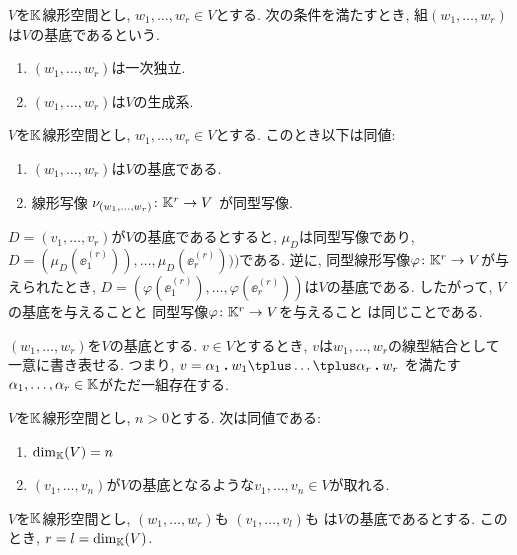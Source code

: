 \begin{definition}
  $V$を$\mathbb{K}$線形空間とし,
  $w_1,\ldots,w_r\in V$とする.
  次の条件を満たすとき,
  組$(w_1,\ldots,w_r)$は$V$の基底であるという.
  \begin{enumerate}
  \item $(w_1,\ldots,w_r)$は一次独立.
  \item $(w_1,\ldots,w_r)$は$V$の生成系.
  \end{enumerate}
\end{definition}
\begin{prop}
  $V$を$\mathbb{K}$線形空間とし,
  $w_1,\ldots,w_r\in V$とする.
  このとき以下は同値:
  \begin{enumerate}
  \item $(w_1,\ldots,w_r)$は$V$の基底である.
  \item 線形写像 $\nu_{(w_1,\ldots,w_r)}\colon \mathbb{K}^r\to V$
    が同型写像.
  \end{enumerate}
\end{prop}
\begin{remark}
  $D=(v_1,\ldots,v_r)$が$V$の基底であるとすると,
  $\mu_D$は同型写像であり,
  $D=(\mu_D(\ee^{(r)}_1)),\ldots,\mu_D(\ee^{(r)}_r)))$である.
  逆に, 同型線形写像$\varphi\colon \mathbb{K}^r\to V$が与えられたとき,
  $D=(\varphi(\ee^{(r)}_1),\ldots,\varphi(\ee^{(r)}_r))$は$V$の基底である.
  したがって,
  $V$の基底を与えることと
  同型写像$\varphi\colon \mathbb{K}^r\to V$を与えること
  は同じことである.
\end{remark}

\begin{prop}
  $(w_1,\ldots,w_r)$を$V$の基底とする.
  $v\in V$とするとき,
  $v$は$w_1,\ldots,w_r$の線型結合として一意に書き表せる.
  つまり,
  $v=\alpha_1\act w_1\plus \ldots\plus \alpha_r\act w_r$
  を満たす$\alpha_1,\ldots, \alpha_r\in\mathbb{K}$がただ一組存在する.
\end{prop}


\begin{lemma}
  $V$を$\mathbb{K}$線形空間とし, $n>0$とする.
  次は同値である:
  \begin{enumerate}
  \item $\dim_{\mathbb{K}}(V)=n$
  \item $(v_1,\ldots,v_n)$が$V$の基底となるような$v_1,\ldots,v_n\in V$が取れる.
  \end{enumerate}
\end{lemma}

\begin{cor}
  $V$を$\mathbb{K}$線形空間とし,
  $(w_1,\ldots,w_r)$も
  $(v_1,\ldots,v_l)$も
  は$V$の基底であるとする.
  このとき, $r=l=\dim_{\mathbb{K}}(V)$.
\end{cor}



